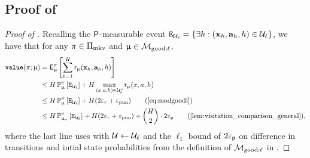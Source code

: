 \subsection{Proof of  \label{sec:proof_of_prob_claims}}
	\begin{proof}[Proof of  ]


		Recalling the $\mathsf{P}$-measurable event $\texttt{E}_{\mathcal{U}_{\ell}} = \{\exists h  : (\mathbf{x}_h,\mathbf{a}_h,h) \in \mathcal{U}_{\ell}\}$, we have that for any $\pi \in \Pi_{\mathrm{mkv}}$ and $\upmu \in \mathcal{M}_{\mathrm{good};\ell}$,
		\begin{align*}
		\valuef{\pi}{\model} &= \sfE^{\pi}_{\model}\left[\sum_{h=1}^H \sfr_{\model}(\bmx_h,\bma_h,h) \right] \\
		&\le H \Pr^{\pi}_{\model}\left[ \Evisit \right] + H \max_{\xah \in \calU_{\ell}^c} \sfr_{\model}\xah \nn\\
		&\le H \Pr^{\pi}_{\model}\left[ \Evisit \right] + H (2\epsr + \epspunish) \tag*{(\Cref{eq:modgoodl})}\\
		&\le H \Pr^{\pi}_{\modst}\left[ \Evisit \right] + H (2\epsr + \epspunish) + \binom{H}{2}\cdot 2\epsp \tag*{(\Cref{lem:visitation_comparison_general})},
		\end{align*}
		where the last line uses 
		 with $\mathcal{U} \gets \mathcal{U}_{\ell}$ and the $\ell_1$ bound of $2\varepsilon_{\mathsf{p}}$ on difference in transitions and intial state probabilities from the definition of $\mathcal{M}_{\mathrm{good};\ell}$ in .
	\end{proof}

